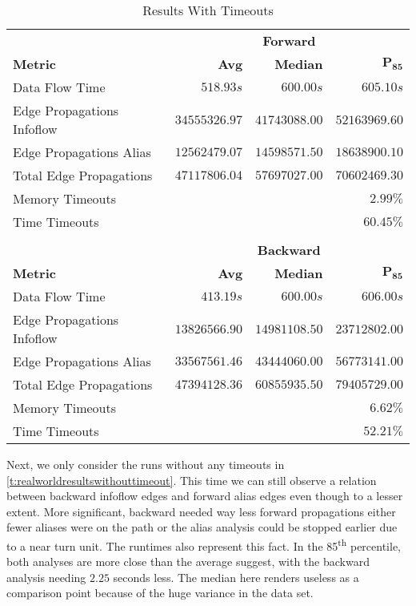 \documentclass[../draft.tex]{subfiles}
\begin{document}
    \begin{table}[ht]
        \centering
        \begin{tabular}{l | r | r | r}
            & \multicolumn{3}{c}{\textbf{Forward}}\\
            \textbf{Metric} & \textbf{Avg} & \textbf{Median} & $\mathbf{P_{85}}$\\
            \hline\hline
            Data Flow Time & $518.93s$ & $600.00s$ & $605.10s$\\
            \hline
            Edge Propagations Infoflow & $34555326.97$ & $41743088.00$ & $52163969.60$\\
            Edge Propagations Alias & $12562479.07$ & $14598571.50$ & $18638900.10$\\
            Total Edge Propagations & $47117806.04$ & $57697027.00$ & $70602469.30$\\
            \hline
            Memory Timeouts & \multicolumn{3}{r}{$2.99\%$}\\
            Time Timeouts & \multicolumn{3}{r}{$60.45\%$}\\            
            \multicolumn{4}{c}{}\\
            & \multicolumn{3}{c}{\textbf{Backward}}\\
            \textbf{Metric} & \textbf{Avg} & \textbf{Median} & $\mathbf{P_{85}}$\\
            \hline\hline
            Data Flow Time & $413.19s$ & $600.00s$ & $606.00s$\\
            \hline
            Edge Propagations Infoflow & $13826566.90$ & $14981108.50$ & $23712802.00$\\
            Edge Propagations Alias & $33567561.46$ & $43444060.00$ & $56773141.00$\\
            Total Edge Propagations & $47394128.36$ & $60855935.50$ & $79405729.00$\\
            \hline\hline
            Memory Timeouts & \multicolumn{3}{r}{$6.62\%$}\\
            Time Timeouts & \multicolumn{3}{r}{$52.21\%$}\\
        \end{tabular}
        \caption{Results With Timeouts}
        \label{t:realworldresults}
    \end{table}

    Next, we only consider the runs without any timeouts in \autoref{t:realworldresultswithouttimeout}. 
    This time we can still observe a relation between backward infoflow edges and forward alias edges even though to a lesser extent. 
    More significant, backward needed way less forward propagations either fewer aliases were on the path or the alias analysis could be stopped earlier due to a near turn unit.
    The runtimes also represent this fact. In the 85\textsuperscript{th} percentile, both analyses are more close than the average suggest, with the backward analysis needing $2.25$ seconds less. 
    The median here renders useless as a comparison point because of the huge variance in the data set.
\end{document}
